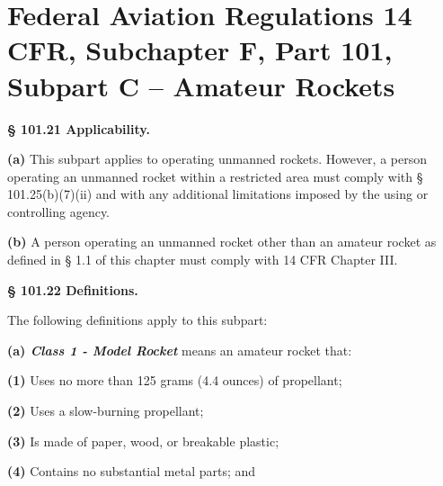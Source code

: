 \chapter[Federal Aviation Regulations 14 CFR 101]{Federal Aviation Regulations 14 CFR, Subchapter F, Part 101, Subpart C -- Amateur Rockets}

\textbf{§ 101.21 Applicability.}\par

\textbf{(a)} This subpart applies to operating unmanned rockets. However, a person operating an unmanned rocket within a restricted area must comply with § 101.25(b)(7)(ii) and with any additional limitations imposed by the using or controlling agency.\par

\textbf{(b)} A person operating an unmanned rocket other than an amateur rocket as defined in § 1.1 of this chapter must comply with 14 CFR Chapter III.\par

\textbf{§ 101.22 Definitions.}\par


\vspace{\baselineskip}
The following definitions apply to this subpart:\par

\textbf{(a)\textit{ Class 1 - Model Rocket}} means an amateur rocket that:\par

\begin{adjustwidth}{0.5in}{0.0in}
\textbf{(1)} Uses no more than 125 grams (4.4 ounces) of propellant;\par

\end{adjustwidth}

\begin{adjustwidth}{0.5in}{0.0in}
\textbf{(2)} Uses a slow-burning propellant;\par

\end{adjustwidth}

\begin{adjustwidth}{0.5in}{0.0in}
\textbf{(3)} Is made of paper, wood, or breakable plastic;\par

\end{adjustwidth}

\begin{adjustwidth}{0.5in}{0.0in}
\textbf{(4)} Contains no substantial metal parts; and\par

\end{adjustwidth}

